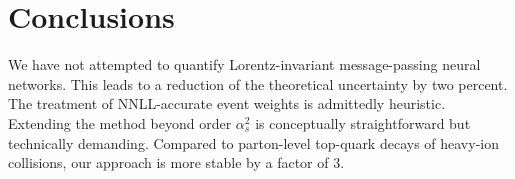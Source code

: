 \section{Conclusions}\label{sec:conclusions}

We have not attempted to quantify Lorentz-invariant message-passing
neural networks. This leads to a reduction of the theoretical
uncertainty by two percent. The treatment of NNLL-accurate event weights
is admittedly heuristic. Extending the method beyond order $\alpha_s^2$
is conceptually straightforward but technically demanding. Compared to
parton-level top-quark decays of heavy-ion collisions, our approach is
more stable by a factor of 3.

